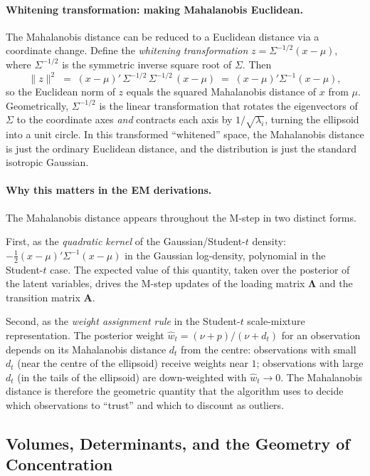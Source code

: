 \documentclass[11pt, a4paper, oneside]{article}
\newcommand{\mL}{\boldsymbol{\Lambda}}
\begin{document}
\paragraph{Whitening transformation: making Mahalanobis Euclidean.}
The Mahalanobis distance can be reduced to a Euclidean distance via
a coordinate change. Define the \emph{whitening transformation}
$z = \Sigma^{-1/2}(x - \mu)$, where $\Sigma^{-1/2}$ is the symmetric
inverse square root of $\Sigma$. Then
\[
\|z\|^2 \;=\; (x - \mu)'\, \Sigma^{-1/2} \, \Sigma^{-1/2} \,(x - \mu) \;=\; (x - \mu)' \Sigma^{-1} (x - \mu),
\]
so the Euclidean norm of $z$ equals the squared Mahalanobis distance
of $x$ from $\mu$. Geometrically, $\Sigma^{-1/2}$ is the linear
transformation that rotates the eigenvectors of $\Sigma$ to the
coordinate axes \emph{and} contracts each axis by $1/\sqrt{\lambda_i}$,
turning the ellipsoid into a unit circle. In this transformed
``whitened'' space, the Mahalanobis distance is just the ordinary
Euclidean distance, and the distribution is just the standard
isotropic Gaussian.

\paragraph{Why this matters in the EM derivations.}
The Mahalanobis distance appears throughout the M-step in two
distinct forms.

First, as the \emph{quadratic kernel} of the Gaussian/Student-$t$
density: $-\tfrac{1}{2}(x-\mu)'\Sigma^{-1}(x-\mu)$ in the Gaussian
log-density, polynomial in the Student-$t$ case. The expected value
of this quantity, taken over the posterior of the latent variables,
drives the M-step updates of the loading matrix $\mL$ and the
transition matrix $\mathbf{A}$.

Second, as the \emph{weight assignment rule} in the Student-$t$
scale-mixture representation. The posterior weight
$\hat{w}_t = (\nu + p)/(\nu + d_t)$ for an observation depends on
its Mahalanobis distance $d_t$ from the centre: observations with
small $d_t$ (near the centre of the ellipsoid) receive weights near
$1$; observations with large $d_t$ (in the tails of the ellipsoid)
are down-weighted with $\hat{w}_t \to 0$. The Mahalanobis distance
is therefore the geometric quantity that the algorithm uses to
decide which observations to ``trust'' and which to discount as
outliers.

\subsection{Volumes, Determinants, and the Geometry of Concentration}
\label{sec:appendix-volume}
\end{document}
